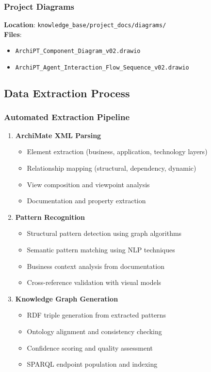 \documentclass[12pt,a4paper]{article}
\begin{document}
\subsubsection{Project Diagrams}
\textbf{Location}: \texttt{knowledge\_base/project\_docs/diagrams/}\\
\textbf{Files}:
\begin{itemize}
    \item \texttt{ArchiPT\_Component\_Diagram\_v02.drawio}
    \item \texttt{ArchiPT\_Agent\_Interaction\_Flow\_Sequence\_v02.drawio}
\end{itemize}

\subsection{Data Extraction Process}

\subsubsection{Automated Extraction Pipeline}

\begin{enumerate}
    \item \textbf{ArchiMate XML Parsing}
    \begin{itemize}
        \item Element extraction (business, application, technology layers)
        \item Relationship mapping (structural, dependency, dynamic)
        \item View composition and viewpoint analysis
        \item Documentation and property extraction
    \end{itemize}

    \item \textbf{Pattern Recognition}
    \begin{itemize}
        \item Structural pattern detection using graph algorithms
        \item Semantic pattern matching using NLP techniques
        \item Business context analysis from documentation
        \item Cross-reference validation with visual models
    \end{itemize}

    \item \textbf{Knowledge Graph Generation}
    \begin{itemize}
        \item RDF triple generation from extracted patterns
        \item Ontology alignment and consistency checking
        \item Confidence scoring and quality assessment
        \item SPARQL endpoint population and indexing
    \end{itemize}
\end{enumerate}
\end{document}
